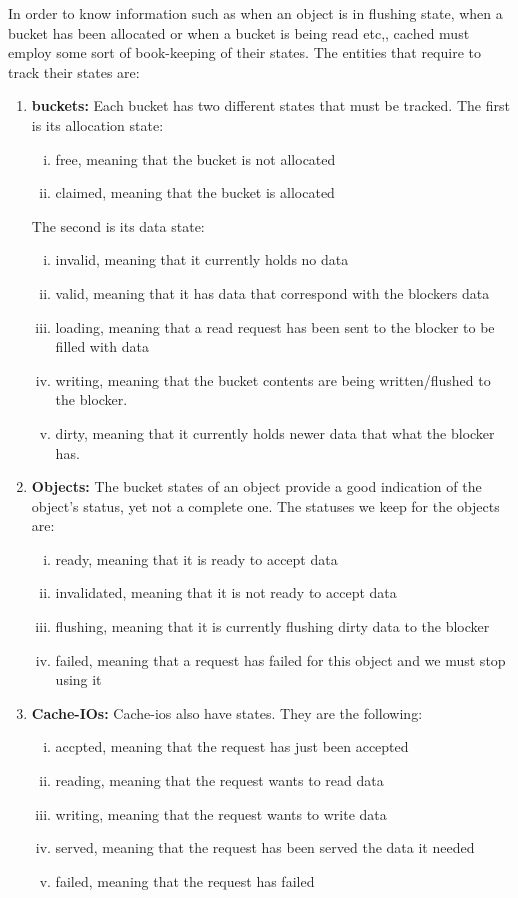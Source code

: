 In order to know information such as when an object is in flushing state, when 
a bucket has been allocated or when a bucket is being read etc,, cached must 
employ some sort of book-keeping of their states. The entities that require to 
track their states are:

\begin{enumerate}
\item \textbf{buckets:} Each bucket has two different states that must be 
	tracked. The first is its allocation state:
	\begin{enumerate}[i)]
		\item free, meaning that the bucket is not allocated
		\item claimed, meaning that the bucket is allocated
	\end{enumerate}
	The second is its data state:
	\begin{enumerate}[i)]
		\item invalid, meaning that it currently holds no data
		\item valid, meaning that it has data that correspond with the 
			blockers data
		\item loading, meaning that a read request has been sent to the 
			blocker to be filled with data
		\item writing, meaning that the bucket contents are being 
			written/flushed to the blocker.
		\item dirty, meaning that it currently holds newer data that 
			what the blocker has.
	\end{enumerate}
\item \textbf{Objects:} The bucket states of an object provide a good 
	indication of the object's status, yet not a complete one. The statuses 
	we keep for the objects are:
	\begin{enumerate}[i)]
		\item ready, meaning that it is ready to accept data
		\item invalidated, meaning that it is not ready to accept data
		\item flushing, meaning that it is currently flushing dirty 
			data to the blocker
		\item failed, meaning that a request has failed for this object 
			and we must stop using it
	\end{enumerate}
\item \textbf{Cache-IOs:} Cache-ios also have states. They are the following:
	\begin{enumerate}[i)]
		\item accpted, meaning that the request has just been accepted
		\item reading, meaning that the request wants to read data
		\item writing, meaning that the request wants to write data
		\item served, meaning that the request has been served the data 
			it needed
		\item failed, meaning that the request has failed
	\end{enumerate}
\end{enumerate}

